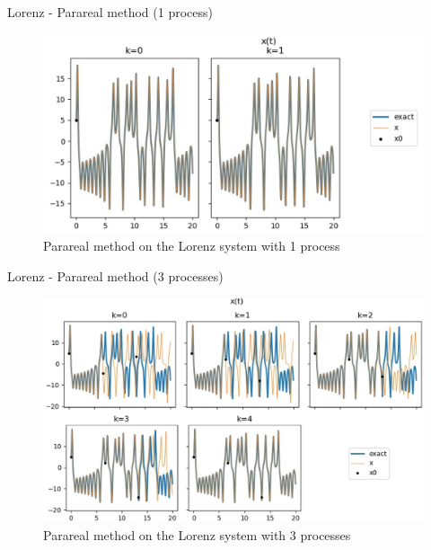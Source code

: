 	\begin{frame}{Lorenz - Parareal method (1 process)}
	
	\begin{minipage}{\linewidth}
	\begin{figure}
		\centering       
		\includegraphics[width=0.95\linewidth]{"images/parareal/lorenz_1p.jpg"}
		\caption{Parareal method on the Lorenz system with 1 process}
	\end{figure}
	\end{minipage}

	\end{frame}
	\begin{frame}{Lorenz - Parareal method (3 processes)}

	\begin{minipage}{\linewidth}
	\begin{figure}
		\centering       
		\includegraphics[width=0.85\linewidth]{"images/parareal/lorenz_3p.jpg"}
		\caption{Parareal method on the Lorenz system with 3 processes}
	\end{figure}
	\end{minipage}
	
	\end{frame}
